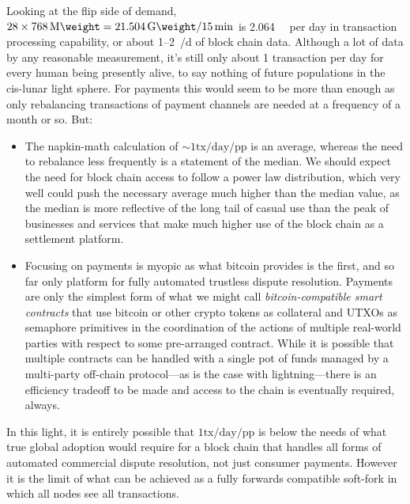 Looking at the flip side of demand, $28 \times \SI{768}{\mega\weight}
= \SI{21.504}{\giga\weight} / \SI{15}{\min}$ is
\SI{2.064}{\tera\weight} per day in transaction processing capability,
or about \numrange{1}{2}\si[per-mode=symbol]{\tera\byte\per\day} of
block chain data.  Although a lot of data by any reasonable
measurement, it's still only about \num{1} transaction per day for
every human being presently alive, to say nothing of future
populations in the cis-lunar light sphere.  For payments this would
seem to be more than enough as only rebalancing transactions of
payment channels are needed at a frequency of a month or so.  But:

\begin{itemize}

  \item

    The napkin-math calculation of
    $\sim1\mathrm{tx}/\mathrm{day}/\mathrm{pp}$ is an average, whereas
    the need to rebalance less frequently is a statement of the
    median.  We should expect the need for block chain access to
    follow a power law distribution, which very well could push the
    necessary average much higher than the median value, as the median
    is more reflective of the long tail of casual use than the peak of
    businesses and services that make much higher use of the block
    chain as a settlement platform.

  \item

    Focusing on payments is myopic as what bitcoin provides is the
    first, and so far only platform for fully automated trustless
    dispute resolution.  Payments are only the simplest form of what
    we might call \emph{bitcoin-compatible smart contracts} that use
    bitcoin or other crypto tokens as collateral and UTXOs as
    semaphore primitives in the coordination of the actions of
    multiple real-world parties with respect to some pre-arranged
    contract.  While it is possible that multiple contracts can be
    handled with a single pot of funds managed by a multi-party
    off-chain protocol---as is the case with lightning---there is an
    efficiency tradeoff to be made and access to the chain is
    eventually required, always.

\end{itemize}

In this light, it is entirely possible that
$1\mathrm{tx}/\mathrm{day}/\mathrm{pp}$ is below the needs of what
true global adoption would require for a block chain that handles all
forms of automated commercial dispute resolution, not just consumer
payments.  However it is the limit of what can be achieved as a fully
forwards compatible soft-fork in which all nodes see all transactions.

